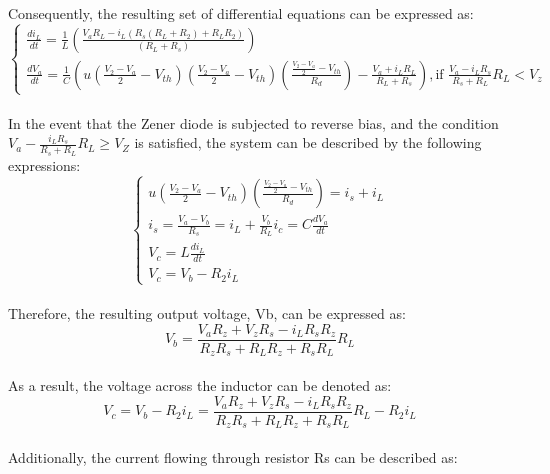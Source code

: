 Consequently, the resulting set of differential equations can be expressed as:\\

\begin{equation}
    \begin{cases}
        \frac{di_L}{dt}=\frac{1}{L}(\frac{V_aR_L-i_L(R_s(R_L+R_2)+R_LR_2)}{(R_L+R_s)})\\
        \frac{dV_a}{dt}=\frac{1}{C}(u(\frac{V_2-V_a}{2}-V_{th})(\frac{V_2-V_a}{2}-V_{th})(\frac{\frac{V_2-V_a}{2}-V_{th}}{R_d})-\frac{V_a+i_LR_L}{R_L+R_s}),  \text{if } \frac{V_a-i_LR_s}{R_s+R_L}R_L<V_z
    \end{cases}
\end{equation}\\

In the event that the Zener diode is subjected to reverse bias, and the condition $V_a - \frac{i_L R_s}{R_s+R_L} R_L \geq V_Z$ is satisfied, the system can be described by the following expressions:\\

\begin{equation}
    \begin{cases}
        u(\frac{V_2-V_a}{2}-V_{th})(\frac{\frac{V_2-V_a}{2}-V_{th}}{R_d})=i_s+i_L\\
        i_s=\frac{V_a-V_b}{R_s}=i_L+\frac{V_b}{R_L}
        i_c=C\frac{dV_a}{dt}\\
        V_c=L\frac{di_L}{dt}\\
        V_c=V_b-R_2i_L
    \end{cases}
\end{equation}\\

Therefore, the resulting output voltage, Vb, can be expressed as:\\

\begin{equation}
    V_b=\frac{V_aR_z+V_zR_s-i_LR_sR_z}{R_zR_s+R_LR_z+R_sR_L}R_L
\end{equation}\\

As a result, the voltage across the inductor can be denoted as:\\

\begin{equation}
    V_c=V_b-R_2i_L=\frac{V_aR_z+V_zR_s-i_LR_sR_z}{R_zR_s+R_LR_z+R_sR_L}R_L-R_2i_L
\end{equation}\\

Additionally, the current flowing through resistor Rs can be described as:\\

